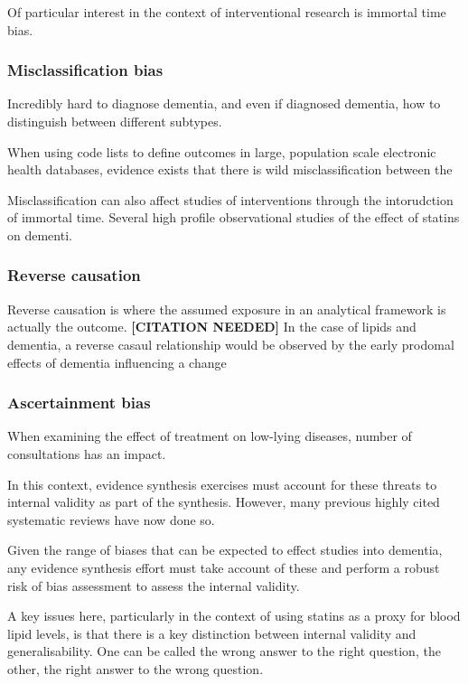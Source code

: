\documentclass[a4paper, twoside]{templates/ociamthesis}
\begin{document}
Of particular interest in the context of interventional research is immortal time bias.

\hypertarget{misclassification-bias}{%
\subsubsection{Misclassification bias}\label{misclassification-bias}}

Incredibly hard to diagnose dementia, and even if diagnosed dementia, how to distinguish between different subtypes.

When using code lists to define outcomes in large, population scale electronic health databases, evidence exists that there is wild misclassification between the

Misclassification can also affect studies of interventions through the intorudction of immortal time. Several high profile observational studies of the effect of statins on dementi.

\hypertarget{reverse-causation}{%
\subsubsection{Reverse causation}\label{reverse-causation}}

Reverse causation is where the assumed exposure in an analytical framework is actually the outcome. \textbf{{[}CITATION NEEDED{]}} In the case of lipids and dementia, a reverse casaul relationship would be observed by the early prodomal effects of dementia influencing a change

\hypertarget{ascertainment-bias}{%
\subsubsection{Ascertainment bias}\label{ascertainment-bias}}

When examining the effect of treatment on low-lying diseases, number of consultations has an impact.

In this context, evidence synthesis exercises must account for these threats to internal validity as part of the synthesis. However, many previous highly cited systematic reviews have now done so.

Given the range of biases that can be expected to effect studies into dementia, any evidence synthesis effort must take account of these and perform a robust risk of bias assessment to assess the internal validity.

A key issues here, particularly in the context of using statins as a proxy for blood lipid levels, is that there is a key distinction between internal validity and generalisability. One can be called the wrong answer to the right question, the other, the right answer to the wrong question.
\end{document}
